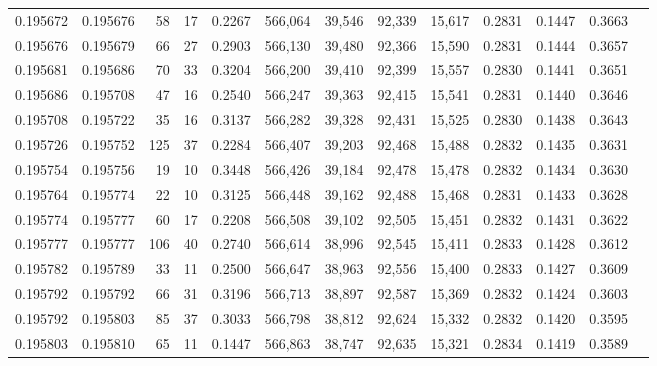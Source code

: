 \begin{tabular}{rrrrrrrrrrrrr}
0.195672 & 0.195676 &    58 &  17 &                                     0.2267 & 566,064 &  39,546 &  92,339 &  15,617 & 0.2831 & 0.1447 & 0.3663 \\
0.195676 & 0.195679 &    66 &  27 &                                     0.2903 & 566,130 &  39,480 &  92,366 &  15,590 & 0.2831 & 0.1444 & 0.3657 \\
0.195681 & 0.195686 &    70 &  33 &                                     0.3204 & 566,200 &  39,410 &  92,399 &  15,557 & 0.2830 & 0.1441 & 0.3651 \\
0.195686 & 0.195708 &    47 &  16 &                                     0.2540 & 566,247 &  39,363 &  92,415 &  15,541 & 0.2831 & 0.1440 & 0.3646 \\
0.195708 & 0.195722 &    35 &  16 &                                     0.3137 & 566,282 &  39,328 &  92,431 &  15,525 & 0.2830 & 0.1438 & 0.3643 \\
0.195726 & 0.195752 &   125 &  37 &                                     0.2284 & 566,407 &  39,203 &  92,468 &  15,488 & 0.2832 & 0.1435 & 0.3631 \\
0.195754 & 0.195756 &    19 &  10 &                                     0.3448 & 566,426 &  39,184 &  92,478 &  15,478 & 0.2832 & 0.1434 & 0.3630 \\
0.195764 & 0.195774 &    22 &  10 &                                     0.3125 & 566,448 &  39,162 &  92,488 &  15,468 & 0.2831 & 0.1433 & 0.3628 \\
0.195774 & 0.195777 &    60 &  17 &                                     0.2208 & 566,508 &  39,102 &  92,505 &  15,451 & 0.2832 & 0.1431 & 0.3622 \\
0.195777 & 0.195777 &   106 &  40 &                                     0.2740 & 566,614 &  38,996 &  92,545 &  15,411 & 0.2833 & 0.1428 & 0.3612 \\
0.195782 & 0.195789 &    33 &  11 &                                     0.2500 & 566,647 &  38,963 &  92,556 &  15,400 & 0.2833 & 0.1427 & 0.3609 \\
0.195792 & 0.195792 &    66 &  31 &                                     0.3196 & 566,713 &  38,897 &  92,587 &  15,369 & 0.2832 & 0.1424 & 0.3603 \\
0.195792 & 0.195803 &    85 &  37 &                                     0.3033 & 566,798 &  38,812 &  92,624 &  15,332 & 0.2832 & 0.1420 & 0.3595 \\
0.195803 & 0.195810 &    65 &  11 &                                     0.1447 & 566,863 &  38,747 &  92,635 &  15,321 & 0.2834 & 0.1419 & 0.3589 \\

\end{tabular}
